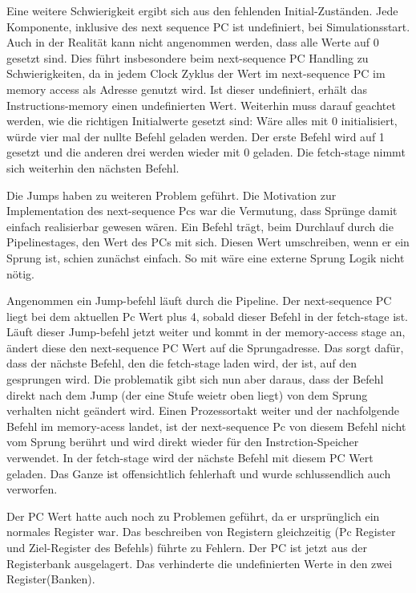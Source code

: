 \documentclass[paper=a4,fontsize=12pt,twocolumn]{scrreprt}
\begin{document}
Eine weitere Schwierigkeit ergibt sich aus den fehlenden Initial-Zuständen.
Jede Komponente, inklusive des next sequence PC ist undefiniert, bei Simulationsstart.
Auch in der Realität kann nicht angenommen werden, dass alle Werte auf 0 gesetzt sind.
Dies führt insbesondere beim next-sequence PC Handling zu Schwierigkeiten, da in jedem Clock Zyklus der Wert im next-sequence PC im memory access als Adresse genutzt wird.
Ist dieser undefiniert, erhält das Instructions-memory einen undefinierten Wert.
Weiterhin muss darauf geachtet werden, wie die richtigen Initialwerte gesetzt sind:
Wäre alles mit 0 initialisiert, würde vier mal der nullte Befehl geladen werden.
Der erste Befehl wird auf 1 gesetzt und die anderen drei werden wieder mit 0 geladen. Die fetch-stage nimmt sich weiterhin den nächsten Befehl.


Die Jumps haben zu weiteren Problem geführt.
Die Motivation zur Implementation des next-sequence Pcs war die Vermutung, dass Sprünge damit einfach realisierbar gewesen wären.
Ein Befehl trägt, beim Durchlauf durch die Pipelinestages, den Wert des PCs mit sich.
Diesen Wert umschreiben, wenn er ein Sprung ist, schien zunächst einfach.
So mit wäre eine externe Sprung Logik nicht nötig. 

Angenommen ein Jump-befehl läuft durch die  Pipeline.
Der next-sequence PC liegt bei dem aktuellen Pc Wert plus 4, sobald dieser Befehl in der fetch-stage ist.
Läuft dieser Jump-befehl jetzt weiter und kommt in der memory-access stage an, ändert diese den next-sequence PC Wert auf die Sprungadresse.
Das sorgt dafür, dass der nächste Befehl, den die fetch-stage laden wird, der ist, auf den gesprungen wird.
Die problematik gibt sich nun aber daraus, dass der Befehl direkt nach dem Jump (der eine Stufe weietr oben liegt) von dem Sprung verhalten nicht geändert wird.
Einen Prozessortakt weiter und der nachfolgende Befehl im memory-acess landet, ist der next-sequence Pc von diesem Befehl nicht vom Sprung berührt und wird direkt wieder für den Instrction-Speicher verwendet.
In der fetch-stage wird der nächste Befehl mit diesem PC Wert geladen.
Das Ganze ist offensichtlich fehlerhaft und wurde schlussendlich auch verworfen.

Der PC Wert hatte auch noch zu Problemen geführt, da er ursprünglich ein normales Register war.
Das beschreiben von Registern gleichzeitig (Pc Register und Ziel-Register des Befehls) führte zu Fehlern.
Der PC ist jetzt aus der Registerbank ausgelagert.
Das verhinderte die undefinierten Werte in den zwei Register(Banken).
\end{document}
